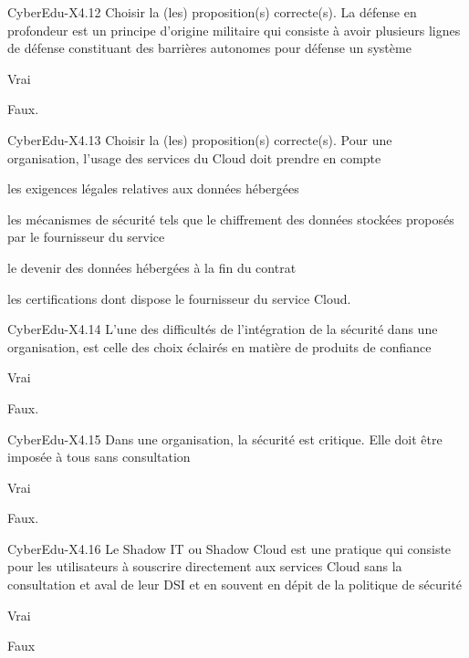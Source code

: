 \begin{multi}[multiple=true]{CyberEdu-X4.12}
Choisir la (les) proposition(s) correcte(s). La défense en profondeur est un principe d'origine militaire qui consiste à avoir plusieurs lignes de défense constituant des barrières autonomes pour défense un système 
\item*	Vrai
\item	Faux.
\end{multi}
\begin{multi}[multiple=true]{CyberEdu-X4.13}
Choisir la (les) proposition(s) correcte(s). Pour une organisation, l'usage des services du Cloud doit prendre en compte 
\item*	les exigences légales relatives aux données hébergées
\item*	les mécanismes de sécurité tels que le chiffrement des données stockées proposés par le fournisseur du service
\item* le devenir des données hébergées à la fin du contrat
\item*	les certifications dont dispose le fournisseur du service Cloud.
\end{multi}
\begin{multi}[multiple=true]{CyberEdu-X4.14}
L'une des difficultés de l'intégration de la sécurité dans une organisation, est celle des choix éclairés en matière de produits de confiance 
\item*	Vrai 
\item	Faux.
\end{multi}
\begin{multi}[multiple=true]{CyberEdu-X4.15}
Dans une organisation, la sécurité est critique. Elle doit être imposée à tous sans consultation
\item	Vrai 
\item*	Faux.
\end{multi}
\begin{multi}[multiple=true]{CyberEdu-X4.16}
Le  Shadow IT  ou  Shadow Cloud  est une pratique qui consiste pour les utilisateurs à souscrire directement aux services Cloud sans la consultation et aval de leur DSI et en souvent en dépit de la politique de sécurité 
\item*	Vrai 
\item	Faux
\end{multi}
